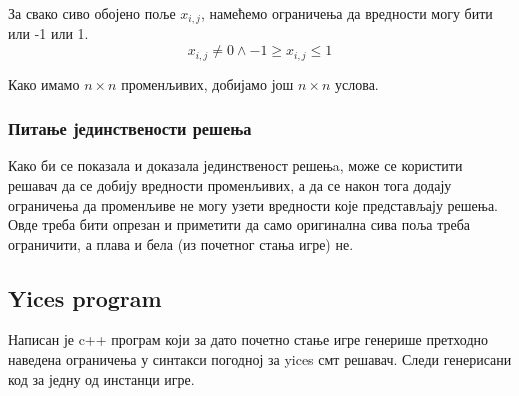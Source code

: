 \documentclass[a4paper]{article}
\begin{document}
За свако сиво обојено поље $x_{i, j}$, намећемо ограничења да вредности могу бити или -1 или 1.
$$
	x_{i, j} \neq 0 \land -1 \geq x_{i, j} \leq 1	
$$

Како имамо $n \times n$ променљивих, добијамо још $n \times n$ услова.

\subsubsection{Питање јединствености решења}
Како би се показала и доказала јединственост решењa, може се користити решавач да се добију вредности променљивих, а да се након тога
додају ограничења да променљиве не могу узети вредности које представљају решења. Овде треба бити опрезан и приметити да само оригинална сива
поља треба ограничити, а плава и бела (из почетног стања игре) не.

\subsection{Yices program}
Написан је c++ програм који за дато почетно стање игре генерише претходно наведена ограничења у синтакси погодној за
yices смт решавач. Следи генерисани код за једну од инстанци игре.
\end{document}
